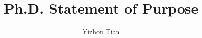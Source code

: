 \documentclass[11pt]{article}
\title{Ph.D. Statement of Purpose}
\author{Yizhou Tian}
\affil{University of Chicago}
\begin{document}
% 




























\clearpage
\singlespacing


\end{document}
